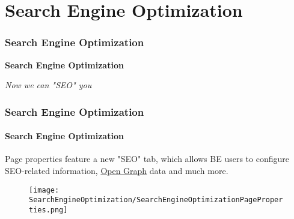 %

\section{Search Engine Optimization}
\begin{frame}[fragile]
	\frametitle{Search Engine Optimization}

	\begin{center}\huge{\color{typo3darkgrey}\textbf{Search Engine Optimization}}\end{center}
	\begin{center}\large{\textit{Now we can "SEO" you}}\end{center}

\end{frame}


\begin{frame}[fragile]
	\frametitle{Search Engine Optimization}
	\framesubtitle{Search Engine Optimization}

	Page properties feature a new "SEO" tab, which allows BE users to configure
	SEO-related information, \href{http://ogp.me/}{Open Graph} data and much more.

	\begin{figure}
		\texttt{[image: SearchEngineOptimization/SearchEngineOptimizationPageProperties.png]}
	\end{figure}

\end{frame}


